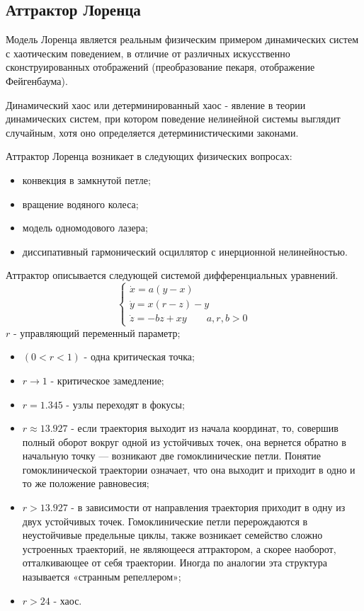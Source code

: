 \subsection{Аттрактор Лоренца}

Модель Лоренца является реальным физическим примером динамических систем с хаотическим поведением, в отличие от различных искусственно сконструированных отображений (преобразование пекаря, отображение Фейгенбаума).
\begin{definition}
Динамический хаос или детерминированный хаос - явление в теории динамических систем, при котором поведение нелинейной системы выглядит случайным, хотя оно определяется детерминистическими законами.
\end{definition}
Аттрактор Лоренца возникает в следующих физических вопросах:
\begin{itemize}
  \item конвекция в замкнутой петле;
\item вращение водяного колеса;
\item модель одномодового лазера;
\item диссипативный гармонический осциллятор с инерционной нелинейностью.
\end{itemize}
Аттрактор описывается следующей системой дифференциальных уравнений.
\begin{equation}
  \begin{cases}
    \dot{x}=a(y-x)\\
    \dot{y}=x(r-z)-y\\
    \dot{z}=-bz+xy \qquad a,r,b>0
  \end{cases}
\end{equation}
$r$ - управляющий переменный параметр;
\begin{itemize}
\item $(0<r<1)$ - одна критическая точка;
\item $r\to 1$ - критическое замедление;
\item $r=1.345$ - узлы переходят в фокусы;
\item $r\approx 13.927$ - если траектория выходит из начала координат, то, совершив полный оборот вокруг одной из устойчивых точек, она вернется обратно в начальную точку — возникают две гомоклинические петли. Понятие гомоклинической траектории означает, что она выходит и приходит в одно и то же положение равновесия;
\item $r>13.927$ -  в зависимости от направления траектория приходит в одну из двух устойчивых точек. Гомоклинические петли перерождаются в неустойчивые предельные циклы, также возникает семейство сложно устроенных траекторий, не являющееся аттрактором, а скорее наоборот, отталкивающее от себя траектории. Иногда по аналогии эта структура называется «странным репеллером»;
\item $r>24$ - хаос.
\end{itemize}
